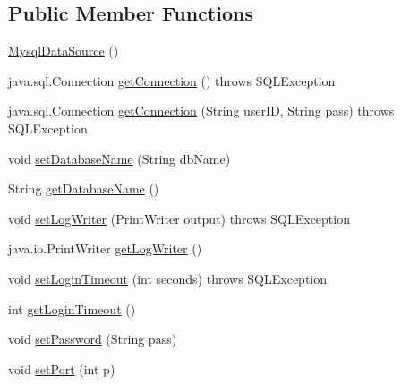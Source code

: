 \subsection*{Public Member Functions}
\begin{DoxyCompactItemize}
\item 
\mbox{\hyperlink{classcom_1_1mysql_1_1jdbc_1_1jdbc2_1_1optional_1_1_mysql_data_source_a658309810bbd98cd869c9d887c6ae574}{Mysql\+Data\+Source}} ()
\item 
java.\+sql.\+Connection \mbox{\hyperlink{classcom_1_1mysql_1_1jdbc_1_1jdbc2_1_1optional_1_1_mysql_data_source_aa19c209327ac343921cb8b4f2e2b30ab}{get\+Connection}} ()  throws S\+Q\+L\+Exception 
\item 
java.\+sql.\+Connection \mbox{\hyperlink{classcom_1_1mysql_1_1jdbc_1_1jdbc2_1_1optional_1_1_mysql_data_source_a63e6a1f58e687db6972674f2e2427141}{get\+Connection}} (String user\+ID, String pass)  throws S\+Q\+L\+Exception 
\item 
void \mbox{\hyperlink{classcom_1_1mysql_1_1jdbc_1_1jdbc2_1_1optional_1_1_mysql_data_source_a3edec7449e5a731ccc6e72270e8baa66}{set\+Database\+Name}} (String db\+Name)
\item 
String \mbox{\hyperlink{classcom_1_1mysql_1_1jdbc_1_1jdbc2_1_1optional_1_1_mysql_data_source_acecf1a115893800067efed693bc8ec15}{get\+Database\+Name}} ()
\item 
void \mbox{\hyperlink{classcom_1_1mysql_1_1jdbc_1_1jdbc2_1_1optional_1_1_mysql_data_source_ac6e830cb3dc98fb7b68f1a8e07dca6cd}{set\+Log\+Writer}} (Print\+Writer output)  throws S\+Q\+L\+Exception 
\item 
java.\+io.\+Print\+Writer \mbox{\hyperlink{classcom_1_1mysql_1_1jdbc_1_1jdbc2_1_1optional_1_1_mysql_data_source_ab54eac84ead3fff16c44bc3bb97cd490}{get\+Log\+Writer}} ()
\item 
void \mbox{\hyperlink{classcom_1_1mysql_1_1jdbc_1_1jdbc2_1_1optional_1_1_mysql_data_source_acdc95b68c75655ad5c91dbd388d712e0}{set\+Login\+Timeout}} (int seconds)  throws S\+Q\+L\+Exception 
\item 
int \mbox{\hyperlink{classcom_1_1mysql_1_1jdbc_1_1jdbc2_1_1optional_1_1_mysql_data_source_a4613f6519c3c71b1b7cd4950399b8cdd}{get\+Login\+Timeout}} ()
\item 
void \mbox{\hyperlink{classcom_1_1mysql_1_1jdbc_1_1jdbc2_1_1optional_1_1_mysql_data_source_ade391cdd38bff8de57b9ef65d62200d1}{set\+Password}} (String pass)
\item 
void \mbox{\hyperlink{classcom_1_1mysql_1_1jdbc_1_1jdbc2_1_1optional_1_1_mysql_data_source_aa25877765807da50745af91b24e38da0}{set\+Port}} (int p)

\end{DoxyCompactItemize}
